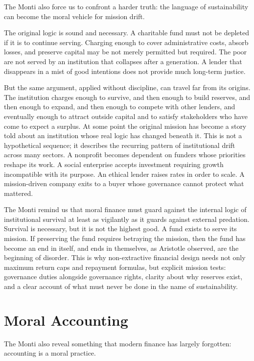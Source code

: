 \documentclass[11pt,a4paper,oneside]{book}
\begin{document}
The Monti also force us to confront a harder truth: the language of sustainability can become the moral vehicle for mission drift.

The original logic is sound and necessary. A charitable fund must not be depleted if it is to continue serving. Charging enough to cover administrative costs, absorb losses, and preserve capital may be not merely permitted but required. The poor are not served by an institution that collapses after a generation. A lender that disappears in a mist of good intentions does not provide much long-term justice.

But the same argument, applied without discipline, can travel far from its origins. The institution charges enough to survive, and then enough to build reserves, and then enough to expand, and then enough to compete with other lenders, and eventually enough to attract outside capital and to satisfy stakeholders who have come to expect a surplus. At some point the original mission has become a story told about an institution whose real logic has changed beneath it. This is not a hypothetical sequence; it describes the recurring pattern of institutional drift across many sectors. A nonprofit becomes dependent on funders whose priorities reshape its work. A social enterprise accepts investment requiring growth incompatible with its purpose. An ethical lender raises rates in order to scale. A mission-driven company exits to a buyer whose governance cannot protect what mattered.

The Monti remind us that moral finance must guard against the internal logic of institutional survival at least as vigilantly as it guards against external predation. Survival is necessary, but it is not the highest good. A fund exists to serve its mission. If preserving the fund requires betraying the mission, then the fund has become an end in itself, and ends in themselves, as Aristotle observed, are the beginning of disorder. This is why non-extractive financial design needs not only maximum return caps and repayment formulas, but explicit mission tests: governance duties alongside governance rights, clarity about why reserves exist, and a clear account of what must never be done in the name of sustainability.

\section*{Moral Accounting}

The Monti also reveal something that modern finance has largely forgotten: accounting is a moral practice.
\end{document}
